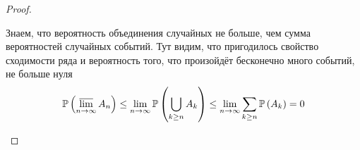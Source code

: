 \begin{proof}
\begin{enumerate}[label=\alph*]
        Знаем, что вероятность объединения случайных не больше,
        чем сумма вероятностей случайных событий.
        Тут видим, что пригодилось свойство сходимости ряда и вероятность того,
        что произойдёт бесконечно много событий, не больше нуля
        $$\mathbb{P}\left( \varlimsup\limits_{n\to\infty} A_n \right)
            \le\lim\limits_{n\to\infty}\mathbb{P}\left( \bigcup_{k\ge n} A_k \right)
            \le\lim\limits_{n\to\infty}\sum_{k\ge n}\mathbb{P}\left( A_k \right)=0$$
    \end{enumerate}
\end{proof}
